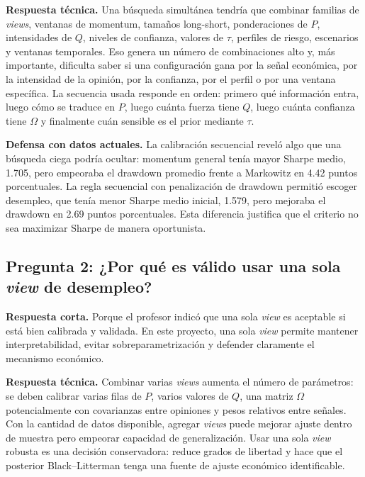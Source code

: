 \documentclass[11pt]{article}
\begin{document}
\textbf{Respuesta t\'ecnica.} Una b\'usqueda simult\'anea tendr\'ia que combinar familias de \textit{views}, ventanas de momentum, tama\~nos long-short, ponderaciones de $P$, intensidades de $Q$, niveles de confianza, valores de $\tau$, perfiles de riesgo, escenarios y ventanas temporales. Eso genera un n\'umero de combinaciones alto y, m\'as importante, dificulta saber si una configuraci\'on gana por la se\~nal econ\'omica, por la intensidad de la opini\'on, por la confianza, por el perfil o por una ventana espec\'ifica. La secuencia usada responde en orden: primero qu\'e informaci\'on entra, luego c\'omo se traduce en $P$, luego cu\'anta fuerza tiene $Q$, luego cu\'anta confianza tiene $\Omega$ y finalmente cu\'an sensible es el prior mediante $\tau$.

\textbf{Defensa con datos actuales.} La calibraci\'on secuencial revel\'o algo que una b\'usqueda ciega podr\'ia ocultar: momentum general ten\'ia mayor Sharpe medio, 1.705, pero empeoraba el drawdown promedio frente a Markowitz en 4.42 puntos porcentuales. La regla secuencial con penalizaci\'on de drawdown permiti\'o escoger desempleo, que ten\'ia menor Sharpe medio inicial, 1.579, pero mejoraba el drawdown en 2.69 puntos porcentuales. Esta diferencia justifica que el criterio no sea maximizar Sharpe de manera oportunista.

\subsection{Pregunta 2: ¿Por qué es válido usar una sola \textit{view} de desempleo?}

\textbf{Respuesta corta.} Porque el profesor indic\'o que una sola \textit{view} es aceptable si est\'a bien calibrada y validada. En este proyecto, una sola \textit{view} permite mantener interpretabilidad, evitar sobreparametrizaci\'on y defender claramente el mecanismo econ\'omico.

\textbf{Respuesta t\'ecnica.} Combinar varias \textit{views} aumenta el n\'umero de par\'ametros: se deben calibrar varias filas de $P$, varios valores de $Q$, una matriz $\Omega$ potencialmente con covarianzas entre opiniones y pesos relativos entre se\~nales. Con la cantidad de datos disponible, agregar \textit{views} puede mejorar ajuste dentro de muestra pero empeorar capacidad de generalizaci\'on. Usar una sola \textit{view} robusta es una decisi\'on conservadora: reduce grados de libertad y hace que el posterior Black--Litterman tenga una fuente de ajuste econ\'omico identificable.
\end{document}
